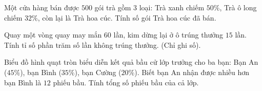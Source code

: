 \begin{ex} %
Một cửa hàng bán được $500$ gói trà gồm $3$ loại: Trà xanh chiếm $50\%$, Trà ô long chiếm $32\%$, còn lại là Trà hoa cúc. Tính số gói Trà hoa cúc đã bán.
\end{ex}

\begin{ex} %
Quay một vòng quay may mắn $60$ lần, kim dừng lại ở ô trúng thưởng $15$ lần. Tính tỉ số phần trăm số lần không trúng thưởng. (Chỉ ghi số).
\end{ex}

\begin{ex} %
Biểu đồ hình quạt tròn biểu diễn kết quả bầu cử lớp trưởng cho ba bạn: Bạn An ($45\%$), bạn Bình ($35\%$), bạn Cường ($20\%$). Biết bạn An nhận được nhiều hơn bạn Bình là $12$ phiếu bầu. Tính tổng số phiếu bầu của cả lớp.
\end{ex}
